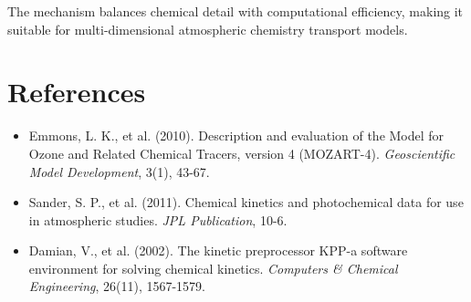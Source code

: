 \documentclass[12pt,a4paper]{article}
\begin{document}
The mechanism balances chemical detail with computational efficiency, making it suitable for multi-dimensional atmospheric chemistry transport models.

\section{References}

\begin{itemize}
    \item Emmons, L. K., et al. (2010). Description and evaluation of the Model for Ozone and Related Chemical Tracers, version 4 (MOZART-4). \textit{Geoscientific Model Development}, 3(1), 43-67.
    \item Sander, S. P., et al. (2011). Chemical kinetics and photochemical data for use in atmospheric studies. \textit{JPL Publication}, 10-6.
    \item Damian, V., et al. (2002). The kinetic preprocessor KPP-a software environment for solving chemical kinetics. \textit{Computers \& Chemical Engineering}, 26(11), 1567-1579.
\end{itemize}
\end{document}

